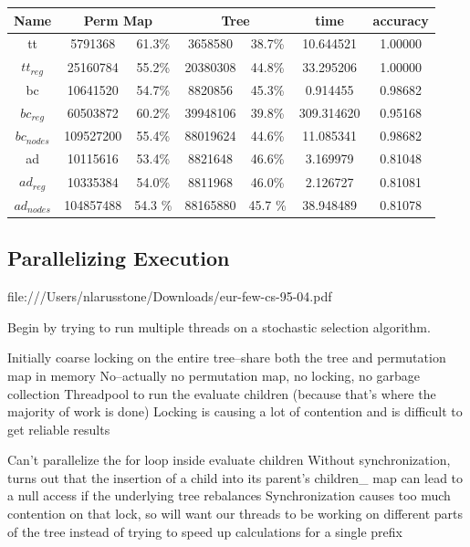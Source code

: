 \documentclass[]{article}
\theoremstyle{definition}
\begin{document}
\begin{center}
\begin{tabular} { |c|c|c|c|c|c|c| }
\hline
Name & \multicolumn{2}{c|}{Perm Map} & \multicolumn{2}{c|}{Tree} & time & accuracy \\
\hline

tt & 5791368 & 61.3\%  & 3658580 & 38.7\% & 10.644521 & 1.00000 \\

$tt_{reg}$ & 25160784 & 55.2\% & 20380308 & 44.8\% & 33.295206 & 1.00000 \\

bc & 10641520 & 54.7\% &8820856 & 45.3\% & 0.914455 & 0.98682 \\

$bc_{reg}$ & 60503872 & 60.2\% & 39948106 & 39.8\% & 309.314620 & 0.95168 \\

$bc_{nodes}$ & 109527200 & 55.4\% & 88019624 & 44.6\% & 11.085341 & 0.98682 \\

ad & 10115616 & 53.4\% & 8821648 & 46.6\% & 3.169979 & 0.81048 \\

$ad_{reg}$ & 10335384 & 54.0\% & 8811968 & 46.0\% & 2.126727 & 0.81081 \\

$ad_{nodes}$ & 104857488 & 54.3 \% & 88165880 & 45.7 \% & 38.948489 &  0.81078\\
\hline
\end{tabular}
\end{center}

\subsection{Parallelizing Execution}

file:///Users/nlarusstone/Downloads/eur-few-cs-95-04.pdf

Begin by trying to run multiple threads on a stochastic selection algorithm.

Initially coarse locking on the entire tree--share both the tree and permutation map in memory
No--actually no permutation map, no locking, no garbage collection
	Threadpool to run the evaluate children (because that's where the majority of work is done)
	Locking is causing a lot of contention and is difficult to get reliable results

Can't parallelize the for loop inside evaluate children
	Without synchronization, turns out that the insertion of a child into its parent's children\_ map can lead to a null access if the underlying tree rebalances
	Synchronization causes too much contention on that lock, so will want our threads to be working on different parts of the tree instead of trying to speed up calculations for a single prefix
\end{document}
